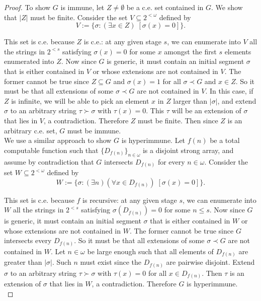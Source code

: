 \documentclass{article}
\begin{document}
  \begin{proof}
    To show $G$ is immune, let $Z\neq\emptyset$ be a c.e. set contained in
    $G$. We show that $|Z|$ must be finite. Consider the set $V\subseteq
    2^{<\omega}$ defined by
    \[V:= \{\sigma: (\exists x\in Z)\; [\sigma(x)=0]\}.\]

    This set is c.e. because $Z$ is c.e.: at any given stage $s$, we can
    enumerate into $V$ all the strings in $2^{<s}$ satisfying $\sigma(x)=0$
    for some $x$ amongst the first $s$ elements enumerated into $Z$. Now
    since $G$ is generic, it must contain an initial segment $\sigma$
    that is either contained in $V$ or whose extensions are not
    contained in $V$. The former cannot be true since $Z\subseteq G$ and
    $\sigma(x)=1$ for all $\sigma\prec G$ and $x\in Z$. So it must be
    that all extensions of some $\sigma\prec G$ are not contained in $V$. In
    this case, if $Z$ is infinite, we will be able to pick an element $x$
    in $Z$ larger than $|\sigma|$, and extend $\sigma$ to an arbitrary
    string $\tau\succ\sigma$ with $\tau(x)=0$. This $\tau$ will be an
    extension of $\sigma$ that lies in $V$, a contradiction. Therefore $Z$
    must be finite. Then since $Z$ is an arbitrary c.e. set, $G$ must be
    immune. \\

    We use a similar approach to show $G$ is hyperimmune. Let $f(n)$ be a
    total computable function such that $\{D_{f(n)}\}_{n\in\omega}$ is a
    disjoint strong array, and assume by contradiction that $G$ intersects
    $D_{f(n)}$ for every $n\in\omega$. Consider the set $W\subseteq
    2^{<\omega}$ defined by
    \[W:= \{\sigma: (\exists n)(\forall x\in D_{f(n)})\;
    [\sigma(x)=0]\}.\]

    This set is c.e. because $f$ is recursive: at any given stage $s$, we
    can enumerate into $W$ all the strings in $2^{<s}$ satisfying
    $\sigma(D_{f(n)})=0$ for some $n\leq s$. Now since $G$ is generic, it
    must contain an initial segment $\sigma$ that is either contained in
    $W$ or whose extensions are not contained in $W$. The former cannot
    be true since $G$ intersects every $D_{f(n)}$. So it must be that all
    extensions of some $\sigma\prec G$ are not contained in $W$. Let
    $n\in\omega$ be large enough such that all elements of $D_{f(n)}$ are
    greater than $|\sigma|$. Such $n$ must exist since the $D_{f(n)}$ are
    pairwise disjoint. Extend $\sigma$ to an arbitrary string
    $\tau\succ\sigma$ with $\tau(x)=0$ for all $x\in D_{f(n)}$. Then $\tau$
    is an extension of $\sigma$ that lies in $W$, a contradiction.
    Therefore $G$ is hyperimmune. \\


\end{proof}
\end{document}
